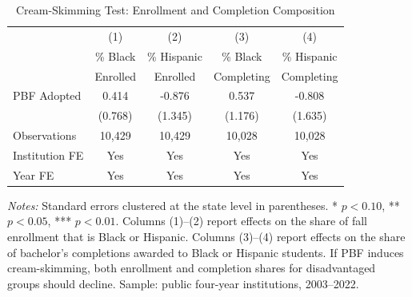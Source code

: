 \begin{table}[H]
\centering
\caption{Cream-Skimming Test: Enrollment and Completion Composition}
\label{tab:cream}
\begin{threeparttable}
\begin{tabular}{lcccc}
\toprule
 & (1) & (2) & (3) & (4) \\
 & \% Black & \% Hispanic & \% Black & \% Hispanic \\
 & Enrolled & Enrolled & Completing & Completing \\
\midrule
PBF Adopted & 0.414 & -0.876 & 0.537 & -0.808 \\
  & (0.768) & (1.345) & (1.176) & (1.635) \\
\addlinespace
Observations & 10,429 & 10,429 & 10,028 & 10,028 \\
Institution FE & Yes & Yes & Yes & Yes \\
Year FE & Yes & Yes & Yes & Yes \\
\bottomrule
\end{tabular}
\begin{tablenotes}[flushleft]
\small
\item \textit{Notes:} Standard errors clustered at the state level in parentheses. * $p<0.10$, ** $p<0.05$, *** $p<0.01$. Columns (1)--(2) report effects on the share of fall enrollment that is Black or Hispanic. Columns (3)--(4) report effects on the share of bachelor's completions awarded to Black or Hispanic students. If PBF induces cream-skimming, both enrollment and completion shares for disadvantaged groups should decline. Sample: public four-year institutions, 2003--2022.
\end{tablenotes}
\end{threeparttable}
\end{table}
